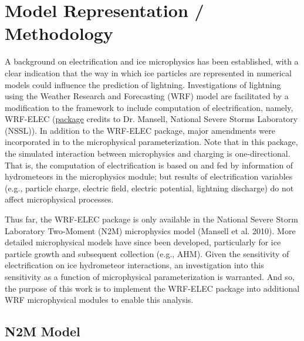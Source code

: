  
\chapter{Model Representation / Methodology}
\label{chap:models}
\resetfootnote %
A background on electrification and ice microphysics has been established, with a clear indication that the way in which ice particles are represented in numerical models could influence the prediction of lightning. Investigations of lightning using the Weather Research and Forecasting (WRF) model are facilitated by a modification to the framework to include computation of electrification, namely, WRF-ELEC (\href{https://sourceforge.net/projects/wrfelec/}{package} credits to Dr. Mansell, National Severe Storms Laboratory (NSSL)). In addition to the WRF-ELEC package, major amendments were incorporated in to the microphysical parameterization. Note that in this package, the simulated interaction between microphysics and charging is one-directional. That is, the computation of electrification is based on and fed by information of hydrometeors in the microphysics module; but results of electrification variables (e.g., particle charge, electric field, electric potential, lightning discharge) do not affect microphysical processes. 

Thus far, the WRF-ELEC package is only available in the National Severe Storm Laboratory Two-Moment (N2M) microphysics model (Mansell et al. 2010). More detailed microphysical models have since been developed, particularly for ice particle growth and subsequent collection (e.g., AHM). Given the sensitivity of electrification on ice hydrometeor interactions, an investigation into this sensitivity as a function of microphysical parameterization is warranted. And so, the purpose of this work is to implement the WRF-ELEC package into additional WRF microphysical modules to enable this analysis.

\section{N2M Model}

